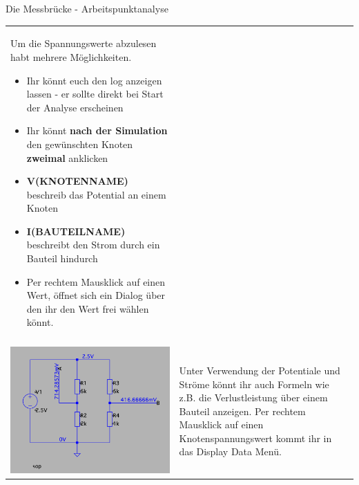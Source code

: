 \begin{frame}[t]{Die Messbrücke - Arbeitspunktanalyse}
\begin{spacing}{0.9}
\begin{tiny}
\begin{table}[h!]
\begin{tabular}{p{3cm} p{7cm}}
\begin{minipage}{.7\textwidth}
            Um die Spannungswerte abzulesen habt mehrere Möglichkeiten.
            \begin{itemize}
              \item Ihr könnt euch den log anzeigen lassen - er sollte direkt bei Start der Analyse erscheinen
              \item Ihr könnt \textbf{nach der Simulation} den gewünschten Knoten \textbf{zweimal} anklicken
              \item \textbf{V(KNOTENNAME)} beschreib das Potential an einem Knoten
              \item \textbf{I(BAUTEILNAME)} beschreibt den Strom durch ein Bauteil hindurch
              \item Per rechtem Mausklick auf einen Wert, öffnet sich ein Dialog über den ihr den Wert frei wählen könnt.
            \end{itemize}
          \end{minipage}
          \\
                                              & \\
          \begin{minipage}{.3\textwidth}
            \includegraphics[width=\linewidth]{pictures/bridge_op_1.png}
          \end{minipage}
                                              &
          \begin{minipage}{.7\textwidth}
            Unter Verwendung der Potentiale und Ströme könnt ihr auch Formeln wie z.B. die Verlustleistung über einem Bauteil
            anzeigen. Per rechtem Mausklick auf einen Knotenspannungswert kommt ihr in das Display Data Menü.

\end{minipage}
\end{tabular}
\end{table}
\end{tiny}
\end{spacing}
\end{frame}
